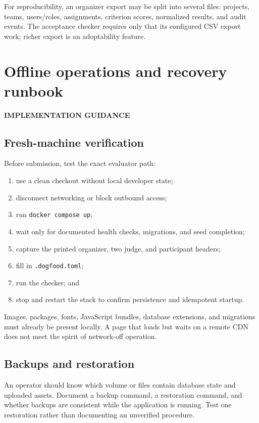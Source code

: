 \documentclass[11pt]{article}
\newcommand{\advisory}{\textcolor{DeepBlue}{\textbf{IMPLEMENTATION GUIDANCE}}}
\begin{document}
For reproducibility, an organizer export may be split into several files: projects, teams, users/roles, assignments, criterion scores, normalized results, and audit events. The acceptance checker requires only that its configured CSV export work; richer export is an adoptability feature.

\section{Offline operations and recovery runbook}

\advisory\par


\subsection{Fresh-machine verification}

Before submission, test the exact evaluator path:

\begin{enumerate}
  \item use a clean checkout without local developer state;
  \item disconnect networking or block outbound access;
  \item run \texttt{docker compose up};
  \item wait only for documented health checks, migrations, and seed completion;
  \item capture the printed organizer, two judge, and participant headers;
  \item fill in \texttt{.dogfood.toml};
  \item run the checker; and
  \item stop and restart the stack to confirm persistence and idempotent startup.
\end{enumerate}

Images, packages, fonts, JavaScript bundles, database extensions, and migrations must already be present locally. A page that loads but waits on a remote CDN does not meet the spirit of network-off operation.

\subsection{Backups and restoration}

An operator should know which volume or files contain database state and uploaded assets. Document a backup command, a restoration command, and whether backups are consistent while the application is running. Test one restoration rather than documenting an unverified procedure.
\end{document}
